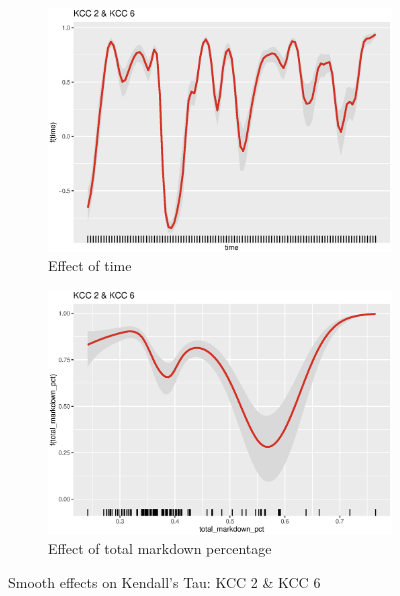 \begin{figure}[H]
\centering
\begin{subfigure}{.45\textwidth}
  \centering
  \includegraphics[width=\linewidth]{figures/time_effect_kcc_26.eps}
  \caption{Effect of time}
  \label{fig:time_effect_kcc_26}
\end{subfigure}
\begin{subfigure}{.45\textwidth}
  \centering
  \includegraphics[width=\linewidth]{figures/markdown_effect_kcc_26.eps}
  \caption{Effect of total markdown percentage}
  \label{fig:markdown_effect_kcc_26}
\end{subfigure}
\caption{Smooth effects on Kendall's Tau: KCC 2 \& KCC 6}
\label{fig:effects_kcc_26}
\end{figure}






